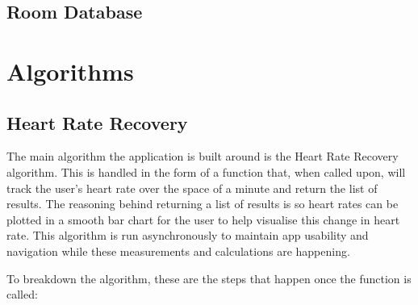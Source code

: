 \documentclass{l4proj}
\begin{document}
\subsection{Room Database}

\section{Algorithms}

\subsection{Heart Rate Recovery}

The main algorithm the application is built around is the Heart Rate Recovery algorithm. This is handled in the form of a function that, when called upon, will track the user’s heart rate over the space of a minute and return the list of results. The reasoning behind returning a list of results is so heart rates can be plotted in a smooth bar chart for the user to help visualise this change in heart rate. This algorithm is run asynchronously to maintain app usability and navigation while these measurements and calculations are happening. 

To breakdown the algorithm, these are the steps that happen once the function is called:
\end{document}
